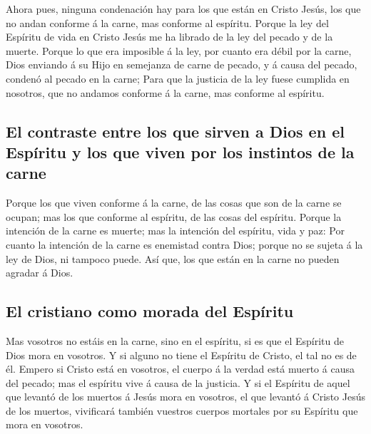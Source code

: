  Ahora pues, ninguna condenación hay para los que están en
Cristo Jesús, los que no andan conforme á la carne, mas conforme al
espíritu.  Porque la ley del Espíritu de vida en Cristo
Jesús me ha librado de la ley del pecado y de la muerte. 
Porque lo que era imposible á la ley, por cuanto era débil por la carne,
Dios enviando á su Hijo en semejanza de carne de pecado, y á causa del
pecado, condenó al pecado en la carne;  Para que la
justicia de la ley fuese cumplida en nosotros, que no andamos conforme á
la carne, mas conforme al espíritu.

\hypertarget{el-contraste-entre-los-que-sirven-a-dios-en-el-espuxedritu-y-los-que-viven-por-los-instintos-de-la-carne}{%
\subsection{El contraste entre los que sirven a Dios en el Espíritu y
los que viven por los instintos de la
carne}\label{el-contraste-entre-los-que-sirven-a-dios-en-el-espuxedritu-y-los-que-viven-por-los-instintos-de-la-carne}}

 Porque los que viven conforme á la carne, de las cosas
que son de la carne se ocupan; mas los que conforme al espíritu, de las
cosas del espíritu.  Porque la intención de la carne es
muerte; mas la intención del espíritu, vida y paz:  Por
cuanto la intención de la carne es enemistad contra Dios; porque no se
sujeta á la ley de Dios, ni tampoco puede.  Así que, los
que están en la carne no pueden agradar á Dios.

\hypertarget{el-cristiano-como-morada-del-espuxedritu}{%
\subsection{El cristiano como morada del
Espíritu}\label{el-cristiano-como-morada-del-espuxedritu}}

 Mas vosotros no estáis en la carne, sino en el espíritu,
si es que el Espíritu de Dios mora en vosotros. Y si alguno no tiene el
Espíritu de Cristo, el tal no es de él.  Empero si Cristo
está en vosotros, el cuerpo á la verdad está muerto á causa del pecado;
mas el espíritu vive á causa de la justicia.  Y si el
Espíritu de aquel que levantó de los muertos á Jesús mora en vosotros,
el que levantó á Cristo Jesús de los muertos, vivificará también
vuestros cuerpos mortales por su Espíritu que mora en vosotros.

